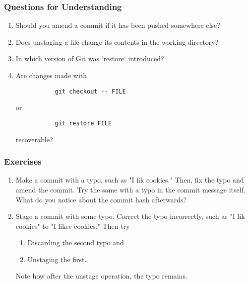 \subsubsection{Questions for Understanding}
\begin{enumerate}
	\item Should you amend a commit if it has been pushed somewhere else?
	\item Does unstaging a file change its contents in the working directory?
	\item In which version of Git was `restore` introduced?
	\item Are changes made with
	   \begin{verbatim}
		   git checkout -- FILE
	   \end{verbatim}
	   or
	   \begin{verbatim}
		   git restore FILE
	   \end{verbatim}
	   recoverable?
\end{enumerate}

\subsubsection{Exercises}
\begin{enumerate}
	\item Make a commit with a typo, such as "I lik cookies."
	   Then, fix the typo and amend the commit.
	   Try the same with a typo in the commit message itself.
	   What do you notice about the commit hash afterwards?
	\item Stage a commit with some typo.
	   Correct the typo incorrectly,
	   such as "I lik cookies" to "I likee cookies."
	   Then try
	   \begin{enumerate}
		   \item Discarding the second typo and
		   \item Unstaging the first.
	   \end{enumerate}
	   Note how after the unstage operation, the typo remains.
\end{enumerate}
